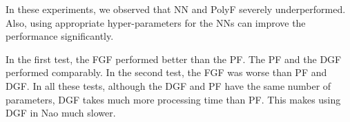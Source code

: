 In these experiments, we observed that NN and PolyF severely underperformed. Also, using appropriate hyper-parameters for the NNs can improve the performance significantly.

In the first test, the FGF performed better than the PF. The PF and the DGF performed comparably. In the second test, the FGF was worse than PF and DGF. In all these tests, although the DGF and PF have the same number of parameters, DGF takes much more processing time than PF. This makes using DGF in Nao much slower.